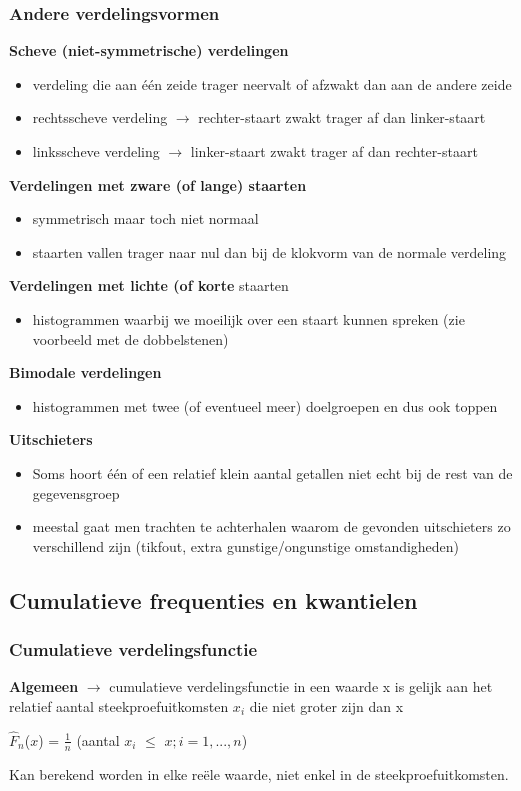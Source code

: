 \documentclass[titlepage]{article}
\numberwithin{equation}{section}
\begin{document}
\subsubsection{Andere verdelingsvormen}
\textbf{Scheve (niet-symmetrische) verdelingen}
\begin{itemize}
	\item verdeling die aan één zeide trager neervalt of afzwakt dan aan de andere zeide
	\item rechtsscheve verdeling $\rightarrow$ rechter-staart zwakt trager af dan linker-staart
	\item linksscheve verdeling $\rightarrow$ linker-staart zwakt trager af dan rechter-staart
\end{itemize}
\begin{flushleft}
\textbf{Verdelingen met zware (of lange) staarten}	
\end{flushleft}
\begin{itemize}
	\item symmetrisch maar toch niet normaal
	\item staarten vallen trager naar nul dan bij de klokvorm van de normale verdeling
\end{itemize}
\textbf{Verdelingen met lichte (of korte} staarten
\begin{itemize}
	\item histogrammen waarbij we moeilijk over een staart kunnen spreken (zie voorbeeld met de dobbelstenen)
\end{itemize}
\textbf{Bimodale verdelingen}
\begin{itemize}
	\item histogrammen met twee (of eventueel meer) doelgroepen en dus ook toppen
\end{itemize}
\textbf{Uitschieters}
\begin{itemize}
	\item Soms hoort één of een relatief klein aantal getallen niet echt bij de rest van de gegevensgroep
	\item meestal gaat men trachten te achterhalen waarom de gevonden uitschieters zo verschillend zijn (tikfout, extra gunstige/ongunstige omstandigheden)
\end{itemize}
\subsection{Cumulatieve frequenties en kwantielen}
\subsubsection{Cumulatieve verdelingsfunctie}
\textbf{Algemeen} $\rightarrow$ cumulatieve verdelingsfunctie in een waarde x is gelijk aan het relatief aantal steekproefuitkomsten $x_{i}$ die niet groter zijn dan x
\begin{center}
	$\hat{F}_{n}$($x$) = $\frac{1}{n}$ (aantal $x_{i}$ $\leq$ $x; i = 1, ...,n$)
\end{center}
Kan berekend worden in elke reële waarde, niet enkel in de steekproefuitkomsten.
\end{document}
